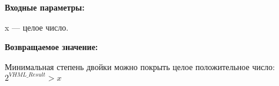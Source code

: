 \textbf{Входные параметры:}  
 
x --- целое число.

\textbf{Возвращаемое значение:}
 
 Минимальная степень двойки можно покрыть целое положительное число: $2^{VHML\_Result}>x$